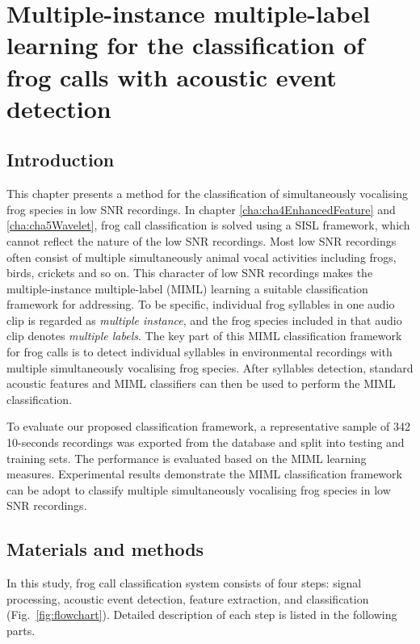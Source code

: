 
\chapter{Multiple-instance multiple-label learning for the classification of frog calls with acoustic event detection}
\label{cha:cha6MIML}


\section{Introduction}
\label{sec:intro}

This chapter presents a method for the classification of simultaneously vocalising frog species in low SNR recordings. In chapter \ref{cha:cha4EnhancedFeature} and \ref{cha:cha5Wavelet}, frog call classification is solved using a SISL framework, which cannot reflect the nature of the low SNR recordings. Most low SNR recordings often consist of multiple simultaneously animal vocal activities including frogs, birds, crickets and so on. This character of low SNR recordings makes the multiple-instance multiple-label (MIML) learning a suitable classification framework for addressing. To be specific, individual frog syllables in one audio clip is regarded as \textit{multiple instance}, and the frog species included in that audio clip denotes \textit{multiple labels}. 
The key part of this MIML classification framework for frog calls is to detect individual syllables in environmental recordings with multiple simultaneously vocalising frog species. After syllables detection, standard acoustic features and MIML classifiers can then be used to perform the MIML classification.


To evaluate our proposed classification framework, a representative sample of 342 10-seconds recordings was exported from the database and split into testing and training sets. The performance is evaluated based on the MIML learning measures. Experimental results demonstrate the MIML classification framework can be adopt to classify multiple simultaneously vocalising frog species in low SNR recordings.



\section{Materials and methods}
In this study, frog call classification system consists of
four steps: signal processing, acoustic event detection, feature
extraction, and classification (Fig.~\ref{fig:flowchart}). Detailed description of each step is listed in the following parts. 


